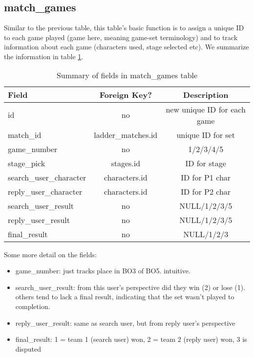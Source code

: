 \documentclass[12pt]{article}
\begin{document}


\subsection{match\_games} %
\label{sub:match_games}
Similar to the previous table, this table's basic function is to assign a unique ID to each game played (game here, meaning game-set terminology) and to track information about each game (characters used, stage selected etc). 
We summarize the information in table \ref{tab:match games}.

\begin{table}[]
  \caption{Summary of fields in match\_games table}
  \label{tab:match games}
  \centering

  \begin{tabular}{l|cc}
  \hline

  \hline
  \textbf{Field} & \textbf{Foreign Key?} & \textbf{Description} \\
  \hline
    id & no & new unique ID for each game \\
    match\_id & ladder\_matches.id & unique ID for set\\
    game\_number & no & 1/2/3/4/5 \\
    stage\_pick & stages.id & ID for stage\\
    search\_user\_character & characters.id & ID for P1 char \\
    reply\_user\_character & characters.id & ID for P2 char \\
    search\_user\_result & no & NULL/1/2/3/5 \\
    reply\_user\_result & no & NULL/1/2/3/5 \\
    final\_result & no & NULL/1/2/3 \\
  \hline

  \hline
  \end{tabular}
\end{table}

Some more detail on the fields:
\begin{itemize}
  \item game\_number: just tracks place in BO3 of BO5. intuitive.
  \item search\_user\_result: from this user's perspective did they win (2) or lose (1). others tend to lack a final result, indicating that the set wasn't played to completion.
  \item reply\_user\_result: same as search user, but from reply user's perspective
  \item final\_result: 1 = team 1 (search user) won, 2 = team 2 (reply user) won, 3 is disputed
\end{itemize}
\end{document}
